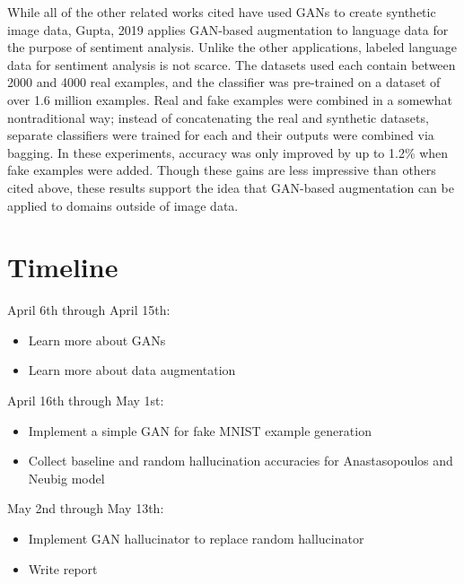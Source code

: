 \documentclass{article}
\begin{document}
    While all of the other related works cited have used GANs to create synthetic image data, Gupta, 2019 \cite{gupta} applies GAN-based augmentation to language data for the purpose of sentiment analysis. Unlike the other applications, labeled language data for sentiment analysis is not scarce. The datasets used each contain between 2000 and 4000 real examples, and the classifier was pre-trained on a dataset of over 1.6 million examples. Real and fake examples were combined in a somewhat nontraditional way; instead of concatenating the real and synthetic datasets, separate classifiers were trained for each and their outputs were combined via bagging. In these experiments, accuracy was only improved by up to 1.2\% when fake examples were added. Though these gains are less impressive than others cited above, these results support the idea that GAN-based augmentation can be applied to domains outside of image data.

  \section{Timeline}
    April 6th through April 15th:
    \begin{itemize}
      \item{Learn more about GANs}
      \item{Learn more about data augmentation}
    \end{itemize}
    April 16th through May 1st:
    \begin{itemize}
      \item{Implement a simple GAN for fake MNIST example generation}
      \item{Collect baseline and random hallucination accuracies for Anastasopoulos and Neubig model}
    \end{itemize}
    May 2nd through May 13th:
    \begin{itemize}
      \item{Implement GAN hallucinator to replace random hallucinator}
      \item{Write report}
    \end{itemize}

  
\end{document}
